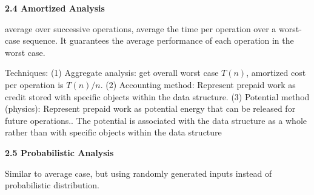     \textbf{2.4 Amortized Analysis}

average over successive operations,
average the time per operation over a worst-case sequence.
It guarantees the average performance of each operation in the worst case.

Techniques:
(1) Aggregate analysis: get overall worst case $T(n)$, amortized cost per operation is $T(n) / n$.
(2) Accounting method: Represent prepaid work as credit stored with speciﬁc objects within the data
structure.
(3) Potential method (physics): Represent prepaid work as potential energy that can be released for future operations..
The potential is associated with the data structure as a whole rather than with speciﬁc objects within the data
structure

    \textbf{2.5 Probabilistic Analysis}

Similar to average case, but using randomly generated inputs instead of probabilistic distribution.

